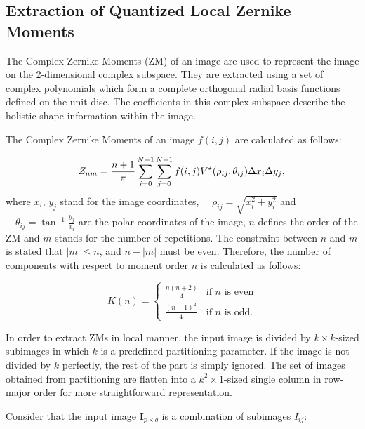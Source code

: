 \documentclass[]{spie}  %
\begin{document}
\subsection{Extraction of Quantized Local Zernike Moments} 

The Complex Zernike Moments (ZM) of an image are used to represent the image on the 2-dimensional complex subspace. They are extracted using a set of complex polynomials which form a complete orthogonal radial basis functions defined on the unit disc. The coefficients in this complex subspace describe the holistic shape information within the image. 

The Complex Zernike Moments of an image $f(i,j)$ are calculated as follows:

\begin{equation}
\label{eq:global_zernike}
Z_{nm} = \frac{n+1}{\pi}\sum^{N-1}_{i=0}\sum^{N-1}_{j=0}f(i,j)V^\star(\rho_{ij},\theta_{ij})\Delta
x_i\Delta y_j, \\
\end{equation}
where $x_i$, $y_j$ stand for the image coordinates, $\quad\rho_{ij}=\sqrt{x_i^2+y_i^2}$ and $\quad\theta_{ij} = \tan^{-1}\frac{y_j}{x_i}$ are the polar coordinates of the image, $n$ defines the order of the ZM and $m$ stands for the number of repetitions. The constraint between $n$ and $m$ is stated that $|m|\leq n$, and $n-|m|$ must be even. Therefore, the number of components with respect to moment order $n$ is calculated as follows:

\begin{equation}
K(n) =
\begin{cases}
  \frac{n(n+2)}{4} &\text{if $n$ is even} \\ 
  \frac{(n+1)^2}{4} &\text{if $n$ is odd}.
\end{cases}
\label{eq:num_moms}
\end{equation}

In order to extract ZMs in local manner, the input image is divided by $k\times k$-sized subimages in which $k$ is a predefined partitioning parameter. If the image is not divided by $k$ perfectly, the rest of the part is simply ignored. The set of images obtained from partitioning are flatten into a  $k^2\times 1$-sized single column in row-major order for more straightforward representation.

Consider that the input image $\mathbf{I}_{p\times q}$ is a combination of subimages $I_{ij}$:
\end{document}
